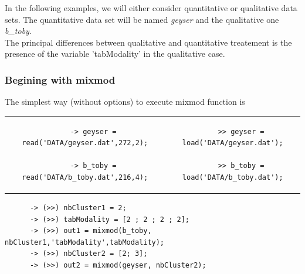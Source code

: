 \vspace*{0.5cm}

In the following examples, we will either consider quantitative or qualitative data sets. The quantitative data set will
be named {\it geyser} and the qualitative one {\it b\_toby}.\\

The principal differences between qualitative and quantitative treatement is the presence of the variable 'tabModality'
in the qualitative case.
\subsubsection{Begining with {\sc mixmod}}

The simplest way (without options) to execute {\sc mixmod} function is


\begin{tabular}{c|c}
\begin{minipage}[c]{0.40\columnwidth}%
{\scriptsize
\begin{verbatim}
    -> geyser = read('DATA/geyser.dat',272,2);

    -> b_toby = read('DATA/b_toby.dat',216,4);
\end{verbatim}}
\end{minipage}%
&
\begin{minipage}[c]{0.60\columnwidth}%
{\scriptsize
\begin{verbatim}
    >> geyser = load('DATA/geyser.dat');

    >> b_toby = load('DATA/b_toby.dat');
\end{verbatim}}
\end{minipage}%
\end{tabular}


{\scriptsize
\begin{verbatim}
      -> (>>) nbCluster1 = 2;
      -> (>>) tabModality = [2 ; 2 ; 2 ; 2];
      -> (>>) out1 = mixmod(b_toby, nbCluster1,'tabModality',tabModality);
      -> (>>) nbCluster2 = [2; 3];
      -> (>>) out2 = mixmod(geyser, nbCluster2);

\end{verbatim}}



